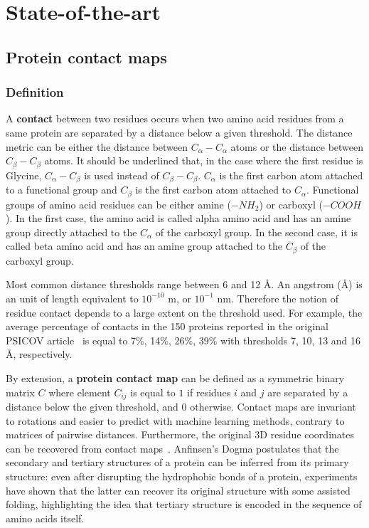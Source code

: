 \chapter{State-of-the-art}

\section{Protein contact maps}

    \subsection{Definition}

        A \textbf{contact} between two residues occurs when two amino acid residues from a same protein are separated by a distance below a given threshold.
        The distance metric can be either the distance between $C_{\alpha}-C_{\alpha}$ atoms or the distance between $C_{\beta}-C_{\beta}$ atoms.
        It should be underlined that, in the case where the first residue is Glycine, $C_{\alpha}-C_{\beta}$ is used instead of $C_{\beta}-C_{\beta}$.  %
        $C_{\alpha}$ is the first carbon atom attached to a functional group and $C_{\beta}$ is the first carbon atom attached to $C_{\alpha}$.
        Functional groups of amino acid residues can be either
        amine ($-NH_2$) or carboxyl ($-COOH$). In the first case, the amino acid is called alpha amino acid and has an amine group
        directly attached to the $C_{\alpha}$ of the carboxyl group. In the second case, it is called beta amino acid and has an amine group attached to
        the $C_{\beta}$ of the carboxyl group.

        Most common distance thresholds range between 6 and 12 \AA{}. An angstrom (\AA{}) is an unit of length equivalent to $10^{-10}$ m, or $10^{-1}$ nm.
        Therefore the notion of residue contact depends to a large extent on the threshold used.
        For example, the average percentage of contacts in the 150 proteins reported in the original PSICOV article~\cite{doi:10.1093/bioinformatics/btr638}
        is equal to 7\%, 14\%, 26\%, 39\% with thresholds 7, 10, 13 and 16 \AA{}, respectively.

        By extension, a \textbf{protein contact map} can be defined as a symmetric binary matrix $C$ where element $C_{ij}$ is equal to $1$ if residues $i$ and $j$
        are separated by a distance below the given threshold, and $0$ otherwise. Contact maps are invariant to rotations and easier to predict
        with machine learning methods, contrary to matrices of pairwise distances. Furthermore, the original 3D residue coordinates can be recovered from
        contact maps~\cite{10.1007/978-3-540-72031-7_53}. Anfinsen's Dogma postulates that the secondary and tertiary structures
        of a protein can be inferred from its primary structure: even after disrupting the hydrophobic bonds of a protein, experiments have shown
        that the latter can recover its original structure with some assisted folding,
        highlighting the idea that tertiary structure is encoded in the sequence of amino acids itself.



